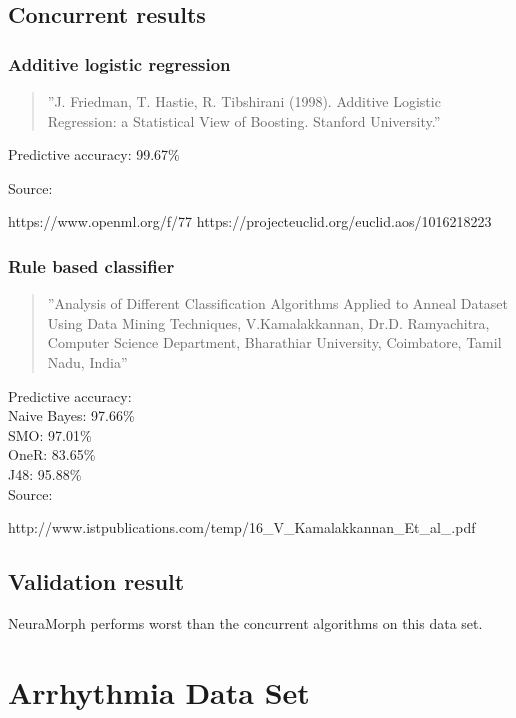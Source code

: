 \documentclass[8pt, a4paper]{article}
\begin{document}
\subsection{Concurrent results}

\subsubsection{Additive logistic regression}

\begin{quote}
''J. Friedman, T. Hastie, R. Tibshirani (1998). Additive Logistic Regression: a Statistical View of Boosting. Stanford University.''
\end{quote}

Predictive accuracy: 99.67\%

Source:

https://www.openml.org/f/77
https://projecteuclid.org/euclid.aos/1016218223

\subsubsection{Rule based classifier}

\begin{quote}
''Analysis of Different Classification Algorithms Applied to Anneal
Dataset Using Data Mining Techniques, V.Kamalakkannan, Dr.D. Ramyachitra, Computer Science Department, Bharathiar University, Coimbatore, Tamil Nadu, India''
\end{quote}

Predictive accuracy:\\
Naive Bayes: 97.66\%\\
SMO: 97.01\%\\
OneR: 83.65\%\\
J48: 95.88\%\\

Source:

http://www.istpublications.com/temp/16\_V\_Kamalakkannan\_Et\_al\_.pdf

\subsection{Validation result}

NeuraMorph performs worst than the concurrent algorithms on this data set.




\newpage
\section{Arrhythmia Data Set}
\end{document}
